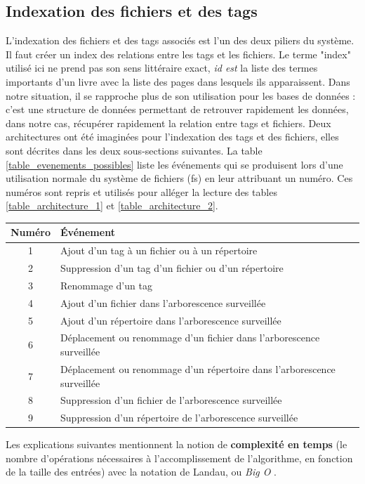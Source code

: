 \subsection{Indexation des fichiers et des tags}
L'indexation des fichiers et des tags associés est l'un des deux piliers du système. Il faut créer 
un index des relations entre les tags et les fichiers. Le terme "index" utilisé ici ne 
prend pas son sens littéraire exact, \textit{id est} la liste des termes importants 
d'un livre avec la liste des pages dans lesquels ils apparaissent. Dans notre situation, il se 
rapproche plus de son utilisation pour les bases de données : c'est une structure de données 
permettant de retrouver rapidement les données, dans notre cas, récupérer rapidement la relation 
entre tags et fichiers. Deux architectures ont été imaginées pour l'indexation des tags et des fichiers, 
elles sont décrites dans les deux sous-sections suivantes. La table \ref{table_evenements_possibles} liste 
les événements qui se produisent lors d'une utilisation normale du système de fichiers (\acrshort{fs}) en leur attribuant 
un numéro. Ces numéros sont repris et utilisés pour alléger la lecture des tables \ref{table_architecture_1} 
et \ref{table_architecture_2}.
\begin{center}
    \begin{tabularx}{15cm}{|c|X|} \hline
        \textbf{Numéro} & \textbf{Événement} \\ \hline
        1 & Ajout d'un tag à un fichier ou à un répertoire \\ \hline
        2 & Suppression d'un tag d'un fichier ou d'un répertoire \\ \hline
        3 & Renommage d'un tag \\ \hline
        4 & Ajout d'un fichier dans l'arborescence surveillée \\ \hline
        5 & Ajout d'un répertoire dans l'arborescence surveillée \\ \hline
        6 & Déplacement ou renommage d'un fichier dans l'arborescence surveillée \\ \hline
        7 & Déplacement ou renommage d'un répertoire dans l'arborescence surveillée \\ \hline
        8 & Suppression d'un fichier de l'arborescence surveillée \\ \hline
        9 & Suppression d'un répertoire de l'arborescence surveillée \\ \hline
    \end{tabularx}
    \label{table_evenements_possibles}
\end{center}
Les explications suivantes mentionnent la notion de \textbf{complexité en temps} (le nombre d'opérations 
nécessaires à l'accomplissement de l'algorithme, en fonction de la taille des entrées) avec la notation 
de Landau, ou \textit{Big O} \cite{ref54}.

